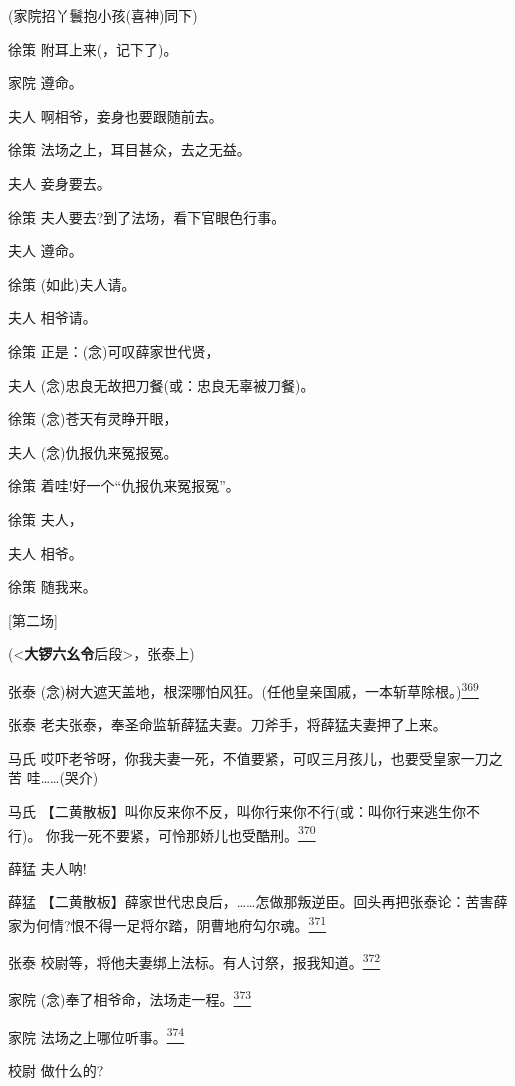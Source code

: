 (家院招丫鬟抱小孩(喜神)同下)

徐策 附耳上来(，记下了)。

家院 遵命。

夫人 啊相爷，妾身也要跟随前去。

徐策 法场之上，耳目甚众，去之无益。

夫人 妾身要去。

徐策 夫人要去?到了法场，看下官眼色行事。

夫人 遵命。

徐策 (如此)夫人请。

夫人 相爷请。

徐策 正是：(念)可叹薛家世代贤，

夫人 (念)忠良无故把刀餐(或：忠良无辜被刀餐)。

徐策 (念)苍天有灵睁开眼，

夫人 (念)仇报仇来冤报冤。

徐策 着哇!好一个``仇报仇来冤报冤''。

徐策 夫人，

夫人 相爷。

徐策 随我来。

{[}第二场{]}

(\textless{}\textbf{大锣六幺令}后段\textgreater{}，张泰上)

张泰
(念)树大遮天盖地，根深哪怕风狂。(任他皇亲国戚，一本斩草除根。)\protect\hyperlink{fn369}{\textsuperscript{369}}

张泰 老夫张泰，奉圣命监斩薛猛夫妻。刀斧手，将薛猛夫妻押了上来。

马氏
哎吓老爷呀，你我夫妻一死，不值要紧，可叹三月孩儿，也要受皇家一刀之苦
哇\ldots{}\ldots{}(哭介)

马氏
【二黄散板】叫你反来你不反，叫你行来你不行(或：叫你行来逃生你不行)。
你我一死不要紧，可怜那娇儿也受酷刑。\protect\hyperlink{fn370}{\textsuperscript{370}}

薛猛 夫人呐!

薛猛
【二黄散板】薛家世代忠良后，\ldots{}\ldots{}怎做那叛逆臣。回头再把张泰论：苦害薛
家为何情?恨不得一足将尔踏，阴曹地府勾尔魂。\protect\hyperlink{fn371}{\textsuperscript{371}}

张泰
校尉等，将他夫妻绑上法标。有人讨祭，报我知道。\protect\hyperlink{fn372}{\textsuperscript{372}}

家院
(念)奉了相爷命，法场走一程。\protect\hyperlink{fn373}{\textsuperscript{373}}

家院 法场之上哪位听事。\protect\hyperlink{fn374}{\textsuperscript{374}}

校尉 做什么的?

